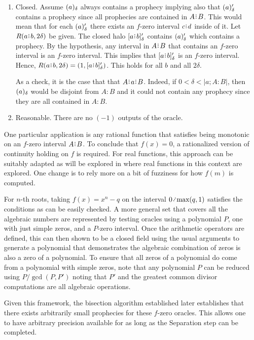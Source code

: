 \documentclass[12pt]{article}
\begin{document}
\begin{enumerate}
\item Closed. Assume $(a)_{\delta}$ always contains a prophecy implying also that $(a)_{\delta}'$ contains a prophecy since all prophecies are contained in $A \rint B$. This would mean that for each $(a)_{\delta}'$ there exists an $f$-zero interval $c\rint d$ inside of it. Let $R(a\rint b, 2\delta)$ be given. The closed halo $\clhalo{a\rint b}'$ contains $(a)_{\delta}'$ which contains a prophecy. By the hypothesis, any interval in $A\rint B$ that contains an $f$-zero interval is an $f$-zero interval. This implies that  $\clhalo{a\rint b}'$ is an $f$-zero interval. Hence, $R(a\rint b, 2 \delta) = (1, \clhalo{a\rint b}') $. This holds for all $b$ and all $2\delta$.

As a check, it is the case that that $A \rint  a\rint  B$. Indeed, if $0 < \delta < |a; A:B|$, then $(a)_{\delta}$ would be disjoint from $A:B$ and it could not contain any prophecy since they are all contained in $A:B$. 

\item Reasonable. There are no $(-1)$ outputs of the oracle. 

\end{enumerate}

One particular application is any rational function that satisfies being monotonic on an $f$-zero interval $A\rint B$. To conclude that $f(x)=0$, a rationalized version of continuity holding on $f$ is required. For real functions, this approach can be suitably adapted as will be explored in \cite{taylor23funora} where real functions in this context are explored. One change is to rely more on a bit of fuzziness for how $f(m)$ is computed. 

For $n$-th roots, taking $f(x) = x^n - q$ on the interval $0 \lte
 \max(q, 1)$ satisfies the conditions as can be easily checked. 
A more general set that covers all the algebraic numbers are represented by testing oracles using a polynomial $P$, one with just simple zeros, and a $P$-zero interval. Once the arithmetic operators are defined, this can then shown to be a closed field using the usual arguments to generate a polynomial that demonstrates the algebraic combination of zeros is also a zero of a polynomial. To ensure that all zeros of a polynomial do come from a polynomial with simple zeros, note that any polynomial $P$ can be reduced using $P/\gcd(P, P')$ noting that $P'$ and the greatest common divisor computations are all algebraic operations. 


Given this framework, the bisection algorithm established later establishes that there exists arbitrarily small prophecies for these $f$-zero oracles. This allows one to have arbitrary precision available for as long as the Separation step can be completed. 
\end{document}
